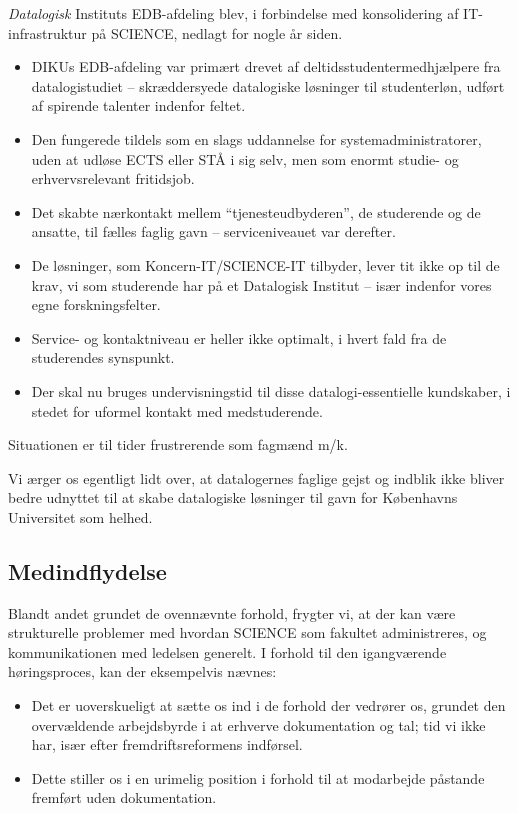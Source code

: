 \documentclass{article}
\begin{document}
\textit{Datalogisk} Instituts EDB-afdeling blev, i forbindelse med konsolidering af IT-infrastruktur på SCIENCE, nedlagt for
nogle år siden.
\begin{itemize}
\itemsep0em 
\item DIKUs EDB-afdeling var primært drevet af deltidsstudentermedhjælpere fra datalogistudiet --
skræddersyede datalogiske løsninger til studenterløn, udført af spirende talenter 
indenfor feltet.
\item Den fungerede tildels som en slags uddannelse for systemadministratorer, uden
at udløse ECTS eller STÅ i sig selv, men som enormt studie- og erhvervsrelevant
fritidsjob.
\item Det skabte nærkontakt mellem ``tjenesteudbyderen'', de studerende og de
ansatte, til fælles faglig gavn -- serviceniveauet var derefter.
\item De løsninger, som Koncern-IT/SCIENCE-IT tilbyder, lever tit ikke op til
de krav, vi som studerende har på et Datalogisk Institut -- især indenfor
vores egne forskningsfelter.
\item Service- og kontaktniveau er heller ikke optimalt, i hvert fald fra de
studerendes synspunkt.
\item Der skal nu bruges undervisningstid til disse datalogi-essentielle
kundskaber, i stedet for uformel kontakt med medstuderende.
\end{itemize}
Situationen er til tider frustrerende som fagmænd m/k.

Vi ærger os egentligt lidt over, at datalogernes faglige gejst og indblik
ikke bliver bedre udnyttet til at skabe datalogiske løsninger til gavn for
Københavns Universitet som helhed.

\subsection{Medindflydelse}

Blandt andet grundet de ovennævnte forhold, frygter vi, at der kan være strukturelle
problemer med hvordan SCIENCE som fakultet administreres, og kommunikationen
med ledelsen generelt. I forhold til den igangværende høringsproces, kan der eksempelvis nævnes:

\begin{itemize}
\itemsep0em 
\item Det er uoverskueligt at sætte os ind i de forhold der vedrører os, grundet den
overvældende arbejdsbyrde i at erhverve dokumentation og tal; tid vi ikke har,
især efter fremdriftsreformens indførsel.
\item Dette stiller os i en urimelig position i forhold til at modarbejde påstande
fremført uden dokumentation.
\end{itemize}
\end{document}
